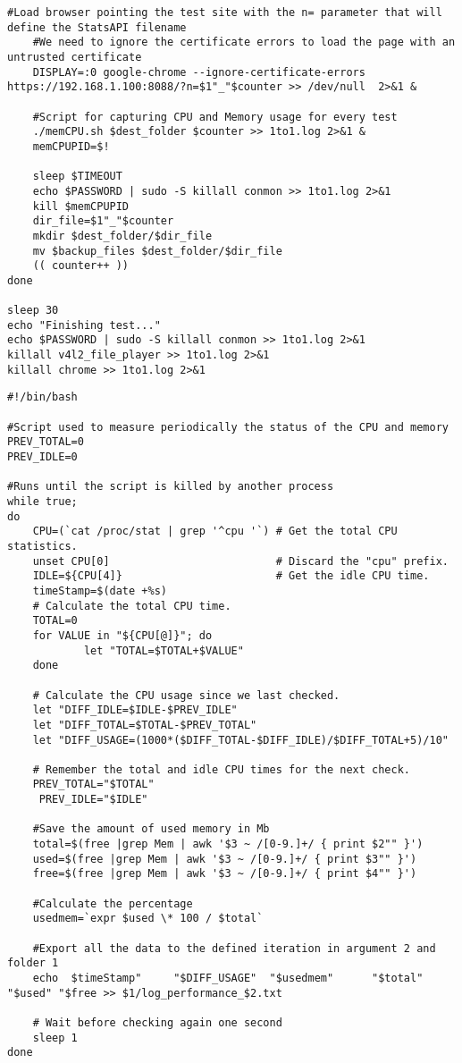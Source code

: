 \begin{lstlisting}[caption=Script for testing WebRTC with 15 iterations]
 	#Load browser pointing the test site with the n= parameter that will define the StatsAPI filename
 	#We need to ignore the certificate errors to load the page with an untrusted certificate
 	DISPLAY=:0 google-chrome --ignore-certificate-errors https://192.168.1.100:8088/?n=$1"_"$counter >> /dev/null  2>&1 &

 	#Script for capturing CPU and Memory usage for every test
 	./memCPU.sh $dest_folder $counter >> 1to1.log 2>&1 &
 	memCPUPID=$!

 	sleep $TIMEOUT
 	echo $PASSWORD | sudo -S killall conmon >> 1to1.log 2>&1
 	kill $memCPUPID
 	dir_file=$1"_"$counter
 	mkdir $dest_folder/$dir_file
 	mv $backup_files $dest_folder/$dir_file
 	(( counter++ ))
done

sleep 30
echo "Finishing test..."
echo $PASSWORD | sudo -S killall conmon >> 1to1.log 2>&1
killall v4l2_file_player >> 1to1.log 2>&1
killall chrome >> 1to1.log 2>&1
\end{lstlisting}

\lstset{language=bash}
\begin{lstlisting}[caption=Measue and store CPU and Memory usage]
#!/bin/bash 

#Script used to measure periodically the status of the CPU and memory
PREV_TOTAL=0 
PREV_IDLE=0 

#Runs until the script is killed by another process
while true; 
do 
  	CPU=(`cat /proc/stat | grep '^cpu '`) # Get the total CPU statistics. 
  	unset CPU[0]                          # Discard the "cpu" prefix. 
  	IDLE=${CPU[4]}                        # Get the idle CPU time. 
  	timeStamp=$(date +%s)
  	# Calculate the total CPU time. 
  	TOTAL=0 
  	for VALUE in "${CPU[@]}"; do 
    		let "TOTAL=$TOTAL+$VALUE" 
  	done 

  	# Calculate the CPU usage since we last checked. 
  	let "DIFF_IDLE=$IDLE-$PREV_IDLE" 
  	let "DIFF_TOTAL=$TOTAL-$PREV_TOTAL" 
  	let "DIFF_USAGE=(1000*($DIFF_TOTAL-$DIFF_IDLE)/$DIFF_TOTAL+5)/10" 

	# Remember the total and idle CPU times for the next check. 
 	PREV_TOTAL="$TOTAL" 
 	 PREV_IDLE="$IDLE" 

  	#Save the amount of used memory in Mb
  	total=$(free |grep Mem | awk '$3 ~ /[0-9.]+/ { print $2"" }')
  	used=$(free |grep Mem | awk '$3 ~ /[0-9.]+/ { print $3"" }')
  	free=$(free |grep Mem | awk '$3 ~ /[0-9.]+/ { print $4"" }')
  	
	#Calculate the percentage
  	usedmem=`expr $used \* 100 / $total`

  	#Export all the data to the defined iteration in argument 2 and folder 1
  	echo  $timeStamp"     "$DIFF_USAGE"  "$usedmem"      "$total"        "$used" "$free >> $1/log_performance_$2.txt

  	# Wait before checking again one second
  	sleep 1 
done
\end{lstlisting}
